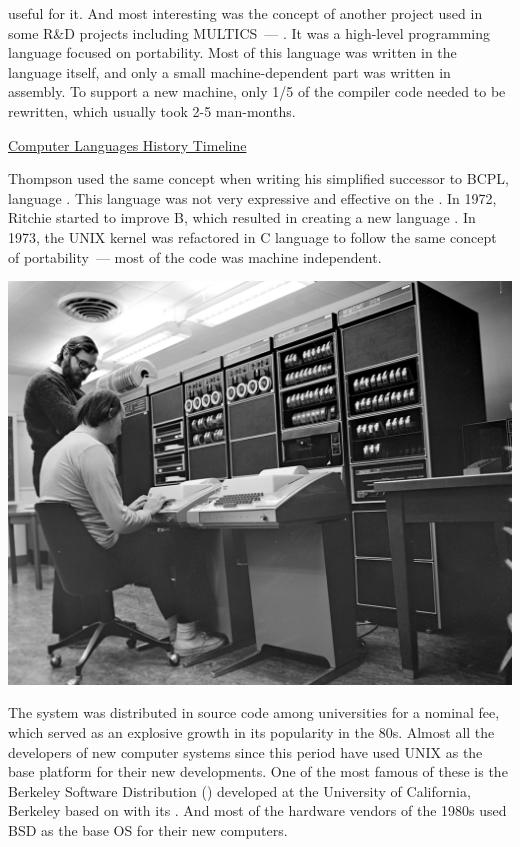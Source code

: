 \noindent
useful for it. And most interesting was the concept of
another project used in some R\&D projects including MULTICS~--- .
It was a high-level programming language focused on portability.
Most of this language was written in the language itself, and only a small
machine-dependent part was written in assembly. To support a new machine,
only 1/5 of the compiler code needed to be rewritten, which usually took
2-5 man-months.

\href{http://www.levenez.com/lang/}{Computer Languages History Timeline}

Thompson used the same concept when writing his simplified successor to BCPL,
language . This language was not very expressive and effective on
the . In 1972, Ritchie started to improve B, which resulted in
creating a new language . In 1973, the UNIX kernel was refactored in C language
to follow the same concept of portability~--- most of the code was machine
independent.
\begin{center}
\includegraphics[scale=0.9]{figs/Ken_Thompson__and_Dennis_Ritchie_at_PDP-11.jpg}
\end{center}

The system was distributed in source code among universities for a nominal fee,
which served as an explosive growth in its popularity in the 80s.
Almost all the developers of new computer systems since this period have used
UNIX as the base platform for their new developments. One of the most famous of
these is the Berkeley Software Distribution () developed at
the University of California, Berkeley based on 
with its . And most of the hardware vendors of
the 1980s used BSD as the base OS for their new computers.

